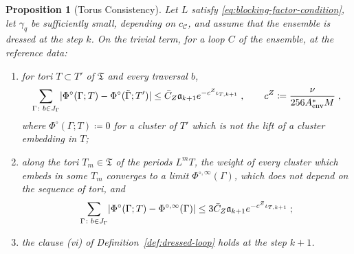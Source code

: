 \documentclass[11pt]{preprint}
\DeclarePairedDelimiter{\abs}{\lvert}{\rvert}
\numberwithin{equation}{section}
\newtheorem{proposition}[theorem]{Proposition}
\theoremstyle{definition}
\theoremstyle{remark}
\theoremstyle{plain}
\begin{document}
\begin{proposition}[Torus Consistency]\label{prop:torus-consistency}
Let $L$ satisfy \eqref{eq:blocking-factor-condition}, let $\gamma_q$ be sufficiently small, depending on $c_{\mathcal C}$, and assume that the ensemble is dressed at the step $k$. On the trivial term, for a loop $C$ of the ensemble, at the reference data:
\begin{enumerate}[label=(\roman*)]
\item for tori $T \subset T'$ of $\mathfrak T$ and every traversal $b$,
\begin{equation}\label{eq:torus-comparison}
    \sum_{\Gamma\colon b \in J_\Gamma}\abs{\Phi^\circ(\Gamma; T) - \Phi^\circ(\tilde\Gamma; T')} \leq \bar C_Z\mathfrak a_{k+1}e^{-c^Z\iota_{T,k+1}}\;,
    \qquad
    c^Z \coloneqq \frac{\nu}{256A^*_{\mathrm{env}}M}\;,
\end{equation}
where $\Phi^\circ(\Gamma; T) \coloneqq 0$ for a cluster of $T'$ which is not the lift of a cluster embedding in $T$;
\item along the tori $T_m \in \mathfrak T$ of the periods $L^mT$, the weight of every cluster which embeds in some $T_m$ converges to a limit $\Phi^{\circ,\infty}(\Gamma)$, which does not depend on the sequence of tori, and
\begin{equation}\label{eq:torus-limit}
    \sum_{\Gamma\colon b \in J_\Gamma}\abs{\Phi^\circ(\Gamma; T) - \Phi^{\circ,\infty}(\Gamma)} \leq 3\bar C_Z\mathfrak a_{k+1}e^{-c^Z\iota_{T,k+1}}\;;
\end{equation}
\item the clause (vi) of Definition~\ref{def:dressed-loop} holds at the step $k + 1$.
\end{enumerate}
\end{proposition}
\end{document}
